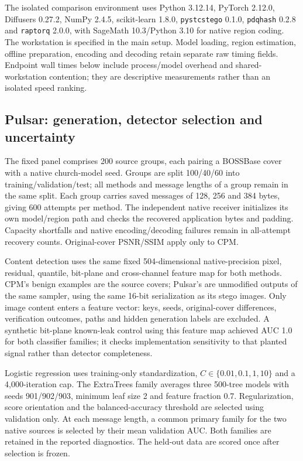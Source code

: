 \documentclass[journal]{IEEEtran}
\theoremstyle{definition}
\theoremstyle{game}
\begin{document}
The isolated comparison environment uses Python 3.12.14, PyTorch 2.12.0,
Diffusers 0.27.2, NumPy 2.4.5, scikit-learn 1.8.0,
\texttt{pystcstego} 0.1.0, \texttt{pdqhash} 0.2.8 and
\texttt{raptorq} 2.0.0, with SageMath 10.3/Python 3.10 for native
region coding. The workstation is specified in the main setup.
Model loading, region estimation, offline preparation, encoding and
decoding retain separate raw timing fields. Endpoint wall times below
include process/model overhead and shared-workstation contention;
they are descriptive measurements rather than an isolated speed ranking.

\subsection{Pulsar: generation, detector selection and uncertainty}
\label{subsec:native-pulsar-method}
The fixed panel comprises 200 source groups, each pairing a
BOSSBase cover with a native church-model seed. Groups are split
100/40/60 into training/validation/test; all methods and message
lengths of a group remain in the same split. Each group carries saved
messages of 128, 256 and 384 bytes, giving 600 attempts per method.
The independent native receiver initializes its own model/region path
and checks the recovered application bytes and padding. Capacity
shortfalls and native encoding/decoding failures remain in all-attempt
recovery counts. Original-cover PSNR/SSIM apply only to CPM.

Content detection uses the same fixed 504-dimensional native-precision
pixel, residual, quantile, bit-plane and cross-channel feature map for
both methods. CPM's benign examples are the source covers; Pulsar's
are unmodified outputs of the same sampler, using the same 16-bit
serialization as its stego images. Only image content enters a feature
vector: keys, seeds, original-cover differences, verification outcomes,
paths and hidden generation labels are excluded. A synthetic bit-plane
known-leak control using this feature map achieved AUC 1.0 for both
classifier families; it checks implementation sensitivity to that
planted signal rather than detector completeness.

Logistic regression uses training-only standardization,
$C\in\{0.01,0.1,1,10\}$ and a 4,000-iteration cap.
The ExtraTrees family averages three 500-tree models with seeds
901/902/903, minimum leaf size 2 and feature fraction 0.7.
Regularization, score orientation and the balanced-accuracy threshold
are selected using validation only. At each message length, a common
primary family for the two native sources is selected by their mean
validation AUC. Both families are retained in the reported diagnostics.
The held-out data are scored once after selection is frozen.
\end{document}
